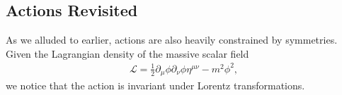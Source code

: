 \subsection{Actions Revisited}

As we alluded to earlier, actions are also heavily constrained by symmetries. Given the Lagrangian density of the massive scalar field
\begin{align*}
    \mathcal{L} = \frac{1}{2} \partial_\mu \phi \partial_\nu \phi \eta^{\mu \nu} - m^2 \phi^2
,\end{align*}
we notice that the action is invariant under Lorentz transformations.

